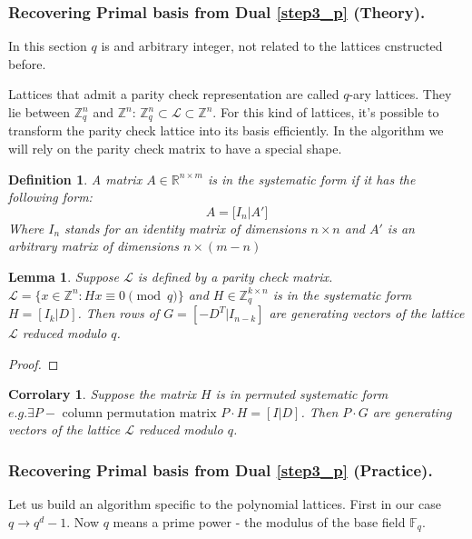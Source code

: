 \documentclass[12pt]{article}
\newcommand{\FF}{\mathbb{F}}
\newcommand{\ZZ}{\mathbb{Z}}
\newcommand{\LL}{\mathcal{L}}
\newtheorem{lemma}{Lemma}
\newtheorem{definition}{Definition}
\newtheorem{corrolary}{Corrolary}
\begin{document}
\subsubsection{Recovering Primal basis from Dual \ref{step3_p} (Theory).}
\label{subsubsec:primal_from_dual_t_polynomials}

In this section $q$ is and arbitrary integer, not related to the lattices cnstructed before.

Lattices that admit a parity check representation are called $q$-ary lattices. They lie between $\ZZ^{n}_{q}$ and $\ZZ^{n}$: $\ZZ^{n}_{q}  \subset \LL \subset \ZZ^{n}$. For this kind of lattices, it's possible to transform the parity check lattice into its basis efficiently. In the algorithm we will rely on the parity check matrix to have a special shape.
\begin{definition}
A matrix $A \in \mathbb{R}^{n \times m}$ is in the systematic form if it has the following form:
\[
A = \big[ I_{n} | A' \big]
\]
Where $I_{n}$ stands for an identity matrix of dimensions $n \times n$ and $A'$ is an arbitrary matrix of dimensions $n \times (m-n)$
\end{definition}

\begin{lemma}\label{coolfact}
    Suppose $\LL$ is defined by a parity check matrix. $\LL = \{x \in \ZZ^{n}: Hx \equiv 0 \pmod{q}\}$ and $H \in \ZZ_{q}^{k \times n}$ is in the systematic form $H = [I_{k}| D]$. Then rows of $G = [-D^{T}| I_{n-k}]$ are generating vectors of the lattice $\LL$ reduced modulo $q$.
\end{lemma}
\begin{proof}

\end{proof}

\begin{corrolary}
Suppose the matrix $H$ is in permuted systematic form $e.g. \exists P - \text{ column permutation matrix } P \cdot H = [I | D]$. Then $P \cdot G$ are generating vectors of the lattice $\LL$ reduced modulo $q$.
\end{corrolary}
\subsubsection{Recovering Primal basis from Dual \ref{step3_p} (Practice).}
\label{subsubsec:primal_from_dual_pr_polynomials}

Let us build an algorithm specific to the polynomial lattices. First in our case $q \rightarrow q^{d} -1$. Now $q$ means a prime power - the modulus of the base field $\FF_{q}$.
\end{document}

